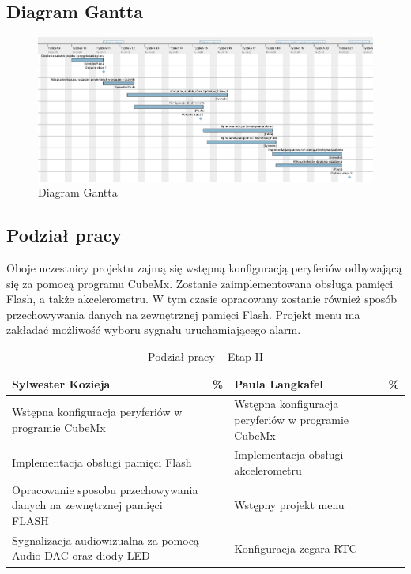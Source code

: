 \documentclass[10pt, a4paper]{article}
\begin{document}
\subsection{Diagram Gantta}


\begin{figure}[H]
	\centering
	\includegraphics[width=1\textwidth]{figures/dg.png}
	\caption{Diagram Gantta}
	\label{fig:DiagramGantta}
\end{figure}


\subsection{Podział pracy}
Oboje uczestnicy projektu zajmą się wstępną konfiguracją peryferiów odbywającą się za pomocą programu CubeMx. Zostanie zaimplementowana obsługa pamięci Flash, a także akcelerometru. W tym czasie opracowany zostanie również sposób przechowywania danych na zewnętrznej pamięci Flash. Projekt menu ma zakładać możliwość wyboru sygnału uruchamiającego alarm.

\begin{table}[H]
	\centering
	\begin{tabular}{|L{7cm}|L{0.8cm}||L{7cm}|L{0.8cm}|}
		\hline
		\hline
		\textbf{Sylwester Kozieja} & 
		\% & 
		\textbf{Paula Langkafel} & \%\\
		\hline
		\hline
		Wstępna konfiguracja peryferiów w programie CubeMx		& &	
		Wstępna konfiguracja peryferiów w programie CubeMx &\\
		\hline
		Implementacja obsługi pamięci Flash & &
		Implementacja obsługi akcelerometru &\\
		\hline
		Opracowanie sposobu przechowywania danych na zewnętrznej pamięci FLASH & &
		Wstępny projekt menu  & \\
		\hline
		Sygnalizacja audiowizualna za pomocą Audio DAC oraz diody LED & & Konfiguracja zegara RTC &\\
		\hline
	\end{tabular}
	\caption{Podział pracy -- Etap II}
	\label{tab:PodzialPracyEtap2}
\end{table}
\end{document}
